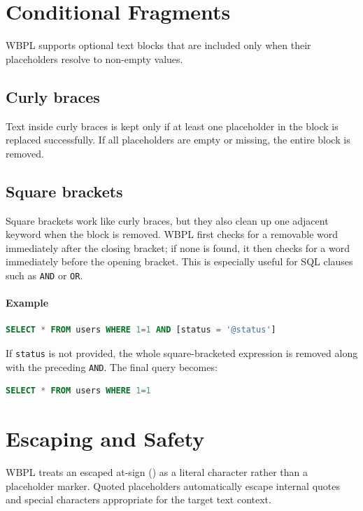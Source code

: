 \section{Conditional Fragments}
WBPL supports optional text blocks that are included only when their placeholders resolve to non-empty values.

\subsection{Curly braces}
Text inside curly braces is kept only if at least one placeholder in the block is replaced successfully. If all placeholders are empty or missing, the entire block is removed.

\subsection{Square brackets}
Square brackets work like curly braces, but they also clean up one adjacent keyword when the block is removed. WBPL first checks for a removable word immediately after the closing bracket; if none is found, it then checks for a word immediately before the opening bracket. This is especially useful for SQL clauses such as \texttt{AND} or \texttt{OR}.

\paragraph{Example}
\begin{lstlisting}[language=SQL,caption={WBPL conditional fragment with SQL cleanup}]
SELECT * FROM users WHERE 1=1 AND [status = '@status']
\end{lstlisting}
If \texttt{status} is not provided, the whole square-bracketed expression is removed along with the preceding \texttt{AND}.
The final query becomes:
\begin{lstlisting}[language=SQL]
  SELECT * FROM users WHERE 1=1
\end{lstlisting}

\section{Escaping and Safety}

WBPL treats an escaped at-sign (\texttt{\@}) as a literal character rather than a placeholder marker. Quoted placeholders automatically escape internal quotes and special characters appropriate for the target text context.

